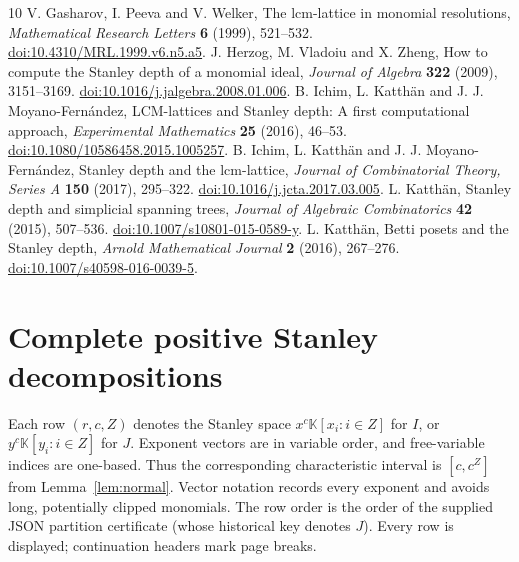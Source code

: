 \documentclass[11pt,a4paper]{article}
\theoremstyle{remark}\newtheorem{remark}[theorem]{Remark}
\newcommand{\K}{\mathbb K}
\newcommand{\code}[1]{\texttt{\detokenize{#1}}}
\begin{document}
\begin{thebibliography}{10}
 V. Gasharov, I. Peeva and V. Welker, The lcm-lattice in monomial resolutions, \emph{Mathematical Research Letters} \textbf{6} (1999), 521--532. \href{https://doi.org/10.4310/MRL.1999.v6.n5.a5}{doi:10.4310/MRL.1999.v6.n5.a5}.
 J. Herzog, M. Vladoiu and X. Zheng, How to compute the Stanley depth of a monomial ideal, \emph{Journal of Algebra} \textbf{322} (2009), 3151--3169. \href{https://doi.org/10.1016/j.jalgebra.2008.01.006}{doi:10.1016/j.jalgebra.2008.01.006}.
 B. Ichim, L. Katth\"an and J. J. Moyano-Fern\'andez, LCM-lattices and Stanley depth: A first computational approach, \emph{Experimental Mathematics} \textbf{25} (2016), 46--53. \href{https://doi.org/10.1080/10586458.2015.1005257}{doi:10.1080/10586458.2015.1005257}.
 B. Ichim, L. Katth\"an and J. J. Moyano-Fern\'andez, Stanley depth and the lcm-lattice, \emph{Journal of Combinatorial Theory, Series A} \textbf{150} (2017), 295--322. \href{https://doi.org/10.1016/j.jcta.2017.03.005}{doi:10.1016/j.jcta.2017.03.005}.
 L. Katth\"an, Stanley depth and simplicial spanning trees, \emph{Journal of Algebraic Combinatorics} \textbf{42} (2015), 507--536. \href{https://doi.org/10.1007/s10801-015-0589-y}{doi:10.1007/s10801-015-0589-y}.
 L. Katth\"an, Betti posets and the Stanley depth, \emph{Arnold Mathematical Journal} \textbf{2} (2016), 267--276. \href{https://doi.org/10.1007/s40598-016-0039-5}{doi:10.1007/s40598-016-0039-5}.
\end{thebibliography}

\appendix
\section{Complete positive Stanley decompositions}\label{app:partitions}
Each row $(r,c,Z)$ denotes the Stanley space $x^c\K[x_i:i\in Z]$ for $I$, or $y^c\K[y_i:i\in Z]$ for $J$. Exponent vectors are in variable order, and free-variable indices are one-based. Thus the corresponding characteristic interval is $[c,c^Z]$ from Lemma~\ref{lem:normal}. Vector notation records every exponent and avoids long, potentially clipped monomials. The row order is the order of the supplied JSON partition certificate (whose historical key \code{I'} denotes $J$). Every row is displayed; continuation headers mark page breaks.
\end{document}
